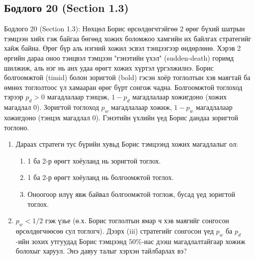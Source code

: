 \documentclass[11pt,a4paper]{article}
\begin{document}
\vspace{0.8em}

\subsection*{Бодлого 20 (Section 1.3)}

\begin{problembox}{Бодлого 20 (Section 1.3): Нөхцөл}
Борис өрсөлдөгчтэйгөө 2 өрөг бүхий шатрын тэмцээн хийх гэж байгаа бөгөөд хожих боломжоо хамгийн их байлгах стратегийг хайж байна. Өрөг бүр аль нэгний хожил эсвэл тэнцээгээр өндөрлөнө. Хэрэв 2 өргийн дараа оноо тэнцвэл тэмцээн "гэнэтийн үхэл" (sudden-death) горимд шилжиж, аль нэг нь анх удаа өрөгт хожих хүртэл үргэлжилнэ. Борис болгоомжтой (timid) болон зоригтой (bold) гэсэн хоёр тоглолтын хэв маягтай ба өмнөх тоглолтоос үл хамааран өрөг бүрт сонгож чадна. Болгоомжтой тоглоход тэрээр $p_d > 0$ магадлалаар тэнцэж, $1 - p_d$ магадлалаар хожигдоно (хожих магадлал 0). Зоригтой тоглоход $p_w$ магадлалаар хожиж, $1 - p_w$ магадлалаар хожигдоно (тэнцэх магадлал 0). Гэнэтийн үхлийн үед Борис дандаа зоригтой тоглоно.

\begin{enumerate}[label=\textbf{(\alph*)}, leftmargin=1.8em, itemsep=1pt]
  \item Дараах стратеги тус бүрийн хувьд Борис тэмцээнд хожих магадлалыг ол:
  \begin{enumerate}[label=\textbf{(\roman*)}, leftmargin=1.5em, itemsep=1pt]
    \item 1 ба 2-р өрөгт хоёуланд нь зоригтой тоглох.
    \item 1 ба 2-р өрөгт хоёуланд нь болгоомжтой тоглох.
    \item Оноогоор илүү явж байвал болгоомжтой тоглож, бусад үед зоригтой тоглох.
  \end{enumerate}
  \item $p_w < 1/2$ гэж үзье (ө.х. Борис тоглолтын ямар ч хэв маягийг сонгосон өрсөлдөгчөөсөө сул тоглогч). Дээрх (iii) стратегийг сонгосон үед $p_w$ ба $p_d$-ийн зохих утгуудад Борис тэмцээнд $50\%$-иас дээш магадлалтайгаар хожиж болохыг харуул. Энэ давуу талыг хэрхэн тайлбарлах вэ?
\end{enumerate}
\end{problembox}
\end{document}
